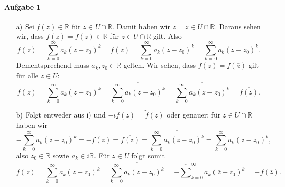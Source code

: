 \documentclass[11pt,a4paper]{article}
\theoremstyle{definition} \newtheorem{theo}{Theorem}[section]
\theoremstyle{definition} \newtheorem{defi}{Definition}[section]
\theoremstyle{definition} \newtheorem{cor}{Corollary}[section]
\theoremstyle{definition} \newtheorem{lemmas}{Lemma}[section]
\theoremstyle{definition} \newtheorem{assp}{Assumption}[section]
\theoremstyle{definition} \newtheorem{exam}{Example}[section]
\theoremstyle{definition} \newtheorem{sol}{Lösung}
\begin{document}
\paragraph{Aufgabe 1}
\begin{itemize} Sei $f:U\to \mathbb{C}$ holomorph für $U=U^{\ast}=\{ z\in \mathbb{C} | \overline{z}\in U\}$. 
	\item[a)] Sei $f(z)\in \mathbb{R}$ für $z\in U\cap \mathbb{R}$. Damit haben wir $z=\overline{z}\in U\cap \mathbb{R}$. Daraus sehen wir, dass $f(z)=f(\overline{z})\in \mathbb{R}$ für $z\in U\cap \mathbb{R}$ gilt. Also
	\begin{equation*}
	f(z)=\sum_{k=0}^{\infty}a_{k}(z-z_{0})^{k}=\overline{f(z)}=\sum_{k=0}^{\infty}\overline{a_{k}}(\overline{z}-\overline{z_{0}})^k=\sum_{k=0}^{\infty}\overline{a_{k}}(z-\overline{z_{0}})^k.
	\end{equation*}
	Dementsprechend muss $a_{k},z_{0}\in \mathbb{R}$ gelten. Wir sehen, dass $f(z)= \overline{f(\overline{z})}$ gilt für alle $z\in U$:
	\begin{equation*}
	f(z)=\sum_{k=0}^{\infty}a_{k}(z-z_{0})^{k}=\overline{\overline{\sum_{k=0}^{\infty}a_{k}(z-z_{0})^{k}}}=\overline{\sum_{k=0}^{\infty}a_{k}(\overline{z}-z_{0})^{k}}=\overline{f(\overline{z})}.
	\end{equation*}
	\item[b)] Folgt entweder aus i) und $-if(z)=\tilde{f}(z)$ oder genauer: für $z\in U\cap \mathbb{R}$ haben wir
	\begin{equation*}
	-\sum_{k=0}^{\infty}a_{k}(z-z_{0})^{k}=-f(z)=\overline{f(z)}=\overline{\sum_{k=0}^{\infty}a_{k}(z-z_{0})^{k}}= \sum_{k=0}^{\infty}\overline{a_{k}}(z-\overline{z_{0}})^{k},
	\end{equation*}
	also $z_{0}\in\mathbb{R}$ sowie $a_{k}\in i\mathbb{R}$. Für $z\in U$ folgt somit
	\begin{equation*}
	f(z)=\sum_{k=0}^{\infty}a_{k}(z-z_{0})^{k}=\overline{\overline{\sum_{k=0}^{\infty}a_{k}(z-z_{0})^{k}}}=-\overline \sum_{k=0}^{\infty}a_{k}(\overline{z}-z_{0})^{k}=-\overline{f(\overline{z})}.
	\end{equation*}
\end{itemize}
\end{document}
